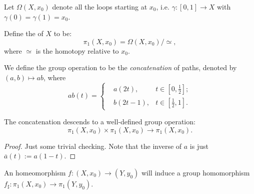 \begin{definition}
	Let $\Omega(X, x_0)$ denote all the loops starting at $x_0$, i.e.
	$\gamma: [0, 1]\to X$ with $\gamma(0) = \gamma(1) = x_0$.

	Define the  of $X$ to be:
	\[
	\pi_1(X, x_0) = \Omega(X, x_0) / \simeq,
	\]
	where $\simeq$ is the homotopy relative to $x_0$.

	We define the group operation to be the \textit{concatenation} of paths,
	denoted by $(a, b)\mapsto ab$, where
	 \[
	ab(t) = \left\{\begin{aligned}
			&a(2t), & t\in [0, \frac{1}{2}];\\
			&b(2t - 1), & t\in [\frac{1}{2}, 1].
	\end{aligned}
	\right.
	\]
\end{definition}

\begin{proposition}
	The concatenation descends to a well-defined group operation:
	\[
	\pi_1(X, x_0) \times \pi_1(X, x_0) \to \pi_1(X, x_0).
	\]
\end{proposition}
\begin{proof}[Proof]
    Just some trivial checking.
	Note that the inverse of $a$ is just $\overline{a}(t) := a(1-t)$.
\end{proof}

\begin{proposition}
	An homeomorphism $f: (X, x_0)\to (Y, y_0)$ will induce a group
	homomorphism $f_\sharp: \pi_1(X, x_0) \to \pi_1(Y, y_0)$.
\end{proposition}
